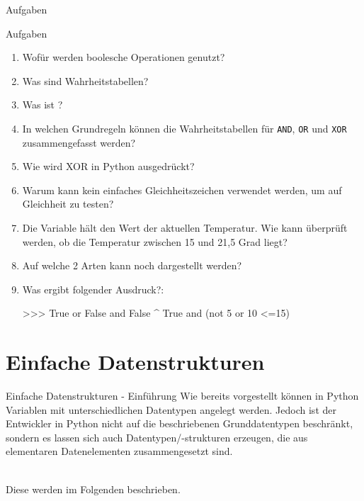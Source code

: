         
        \begin{subsection}{Aufgaben}
            \begin{frame}[fragile]{Aufgaben}
                \begin{enumerate}
                    \item Wofür werden boolesche Operationen genutzt?
                    \item Was sind Wahrheitstabellen?
                    \item Was ist ?
                    \item In welchen Grundregeln können die Wahrheitstabellen für \texttt{AND}, \texttt{OR} und \texttt{XOR} zusammengefasst werden?
                    \item Wie wird XOR in Python ausgedrückt?
                    \item Warum kann kein einfaches Gleichheitszeichen verwendet werden, um auf Gleichheit zu testen?
                    \item Die Variable  hält den Wert der aktuellen Temperatur. Wie kann überprüft werden, ob die Temperatur zwischen 15 und 21,5 Grad liegt?
                    \item Auf welche 2 Arten kann  noch dargestellt werden?
                    \item Was ergibt folgender Ausdruck?:
\begin{pyconcode}
>>> True or False and False ^ True and (not 5 or 10 <=15)
\end{pyconcode}                         
                    
                \end{enumerate}
            \end{frame}
        \end{subsection}
        
    \section{Einfache Datenstrukturen}
        \label{subs:datastruct}
        
        \begin{frame}{Einfache Datenstrukturen - Einführung}
            Wie bereits vorgestellt können in Python Variablen mit unterschiedlichen Datentypen angelegt werden. Jedoch ist der Entwickler in Python nicht auf die beschriebenen Grunddatentypen beschränkt, sondern es lassen sich auch Datentypen/-strukturen erzeugen, die aus elementaren Datenelementen zusammengesetzt sind. \\~\
            
            Diese werden im Folgenden beschrieben.
        \end{frame}
        
